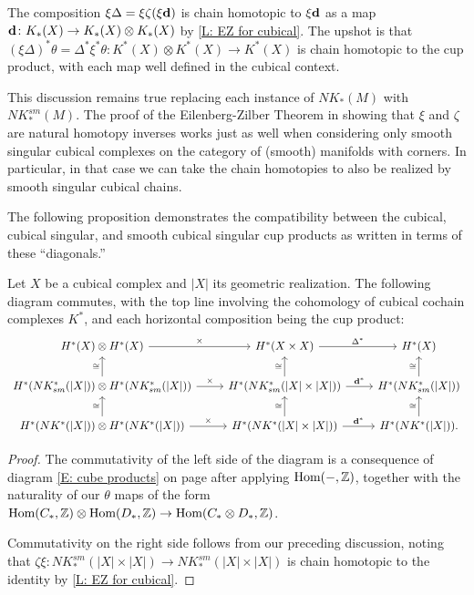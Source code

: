 The composition $\xi \Delta = \xi \zeta (\xi \mathbf{d})$ is chain homotopic to $\xi \mathbf{d}$ as a map $\mathbf{d} \colon K_*(X) \to K_*(X) \otimes K_*(X)$ by \cref{L: EZ for cubical}.
The upshot is that $(\xi \Delta)^*\theta = \Delta^* \xi^* \theta \colon K^*(X) \otimes K^*(X) \to K^*(X)$ is chain homotopic to the cup product, with each map well defined in the cubical context.

\begin{remark}\label{R: smooth Massey}
This discussion remains true replacing each instance of $NK_*(M)$ with $NK_*^{sm}(M)$.
The proof of the Eilenberg-Zilber Theorem in \cite[Section XI.5]{Mas91} showing that $\xi$ and $\zeta$ are natural homotopy inverses works just as well when considering only smooth singular cubical complexes on the category of (smooth) manifolds with corners.
In particular, in that case we can take the chain homotopies to also be realized by smooth singular cubical chains.
\end{remark}

The following proposition demonstrates the compatibility between the cubical, cubical singular, and smooth cubical singular cup products as written in terms of these ``diagonals.''

\begin{proposition}\label{P: cubical and singular cups}
	Let $X$ be a cubical complex and $|X|$ its geometric realization.
	The following diagram commutes, with the top line involving the cohomology of cubical cochain complexes $K^*$, and each horizontal composition being the cup product:
	\[
	\begin{tikzcd}
	H^*(X) \otimes H^*(X) \arrow[r,"\times"]& H^*(X \times X) \arrow[r,"\Delta^*"] & H^*(X)\\
	H^*(NK^*_{sm}(|X|)) \otimes H^*(NK^*_{sm}(|X|)) \arrow[r,"\times"]\arrow[u,"\cong"] & H^*(NK^*_{sm}(|X| \times |X|)) \arrow[r,"\diag^*"]\arrow[u,"\cong"] & H^*(NK^*_{sm}(|X|))\arrow[u,"\cong"]\\
	H^*(NK^*(|X|)) \otimes H^*(NK^*(|X|))\arrow[r,"\times"]\arrow[u,"\cong"] & H^*(NK^*(|X| \times |X|)) \arrow[u,"\cong"]\arrow[r,"\diag^*"] &H^*(NK^*(|X|))\arrow[u,"\cong"].
	\end{tikzcd}
	\]
\end{proposition}
\begin{proof}
The commutativity of the left side of the diagram is a consequence of diagram \eqref{E: cube products} on page \pageref{E: cube products} after applying $\textup{Hom}(-,\mathbb{Z})$,  together with the naturality of our $\theta$ maps of the form $\textup{Hom}(C_*,\mathbb{Z}) \otimes \textup{Hom}(D_*,\mathbb{Z}) \to \textup{Hom}(C_* \otimes D_*,\mathbb{Z})$.

Commutativity on the right side follows from our preceding discussion, noting that $\zeta \xi \colon NK_*^{sm}(|X| \times |X|) \to NK_*^{sm}(|X| \times |X|)$ is chain homotopic to the identity by \cref{L: EZ for cubical}.
\end{proof}


